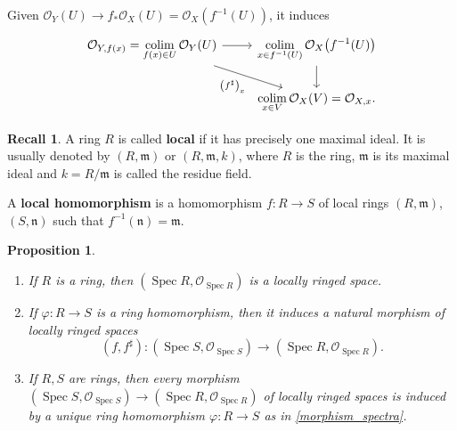 \documentclass[12pt]{article}
\DeclareMathOperator{\Spec}{Spec}
\DeclareMathOperator*{\colim}{colim}
\newtheorem*{proposition}{Proposition}
\theoremstyle{definition}
\newtheorem*{recall}{Recall}
\begin{document}
Given $\mathcal O_Y(U)\rightarrow f_*\mathcal O_X(U)=\mathcal O_X(f^{-1}(U))$, it induces
\[\begin{tikzcd}\mathcal O_{Y,f(x)}=\displaystyle{\colim_{f(x)\in U}\mathcal O_Y(U)}\arrow[r]\arrow[rd,"\left(f^\sharp\right)_x",swap]&\displaystyle{\colim_{x\in f^{-1}(U)}\mathcal O_X\big(f^{-1}(U)\big)}\arrow[d]\\&\displaystyle{\colim_{x\in V}\mathcal O_X(V)=\mathcal O_{X,x}.}\end{tikzcd}\]

\begin{recall}
A ring $R$ is called \textbf{local} if it has precisely one maximal ideal. It is usually denoted by $(R,\mathfrak m)$ or $(R,\mathfrak m,k)$, where $R$ is the ring, $\mathfrak m$ is its maximal ideal and $k=R/\mathfrak m$ is called the residue field.

A \textbf{local homomorphism} is a homomorphism $f:R\rightarrow S$ of local rings $(R,\mathfrak m)$, $(S,\mathfrak n)$ such that $f^{-1}(\mathfrak n)=\mathfrak m$.
\end{recall}

\begin{proposition}
\begin{enumerate}[label=\arabic*)]
\item If $R$ is a ring, then $(\Spec R,\mathcal O_{\Spec R})$ is a locally ringed space.

\item\label{morphism_spectra} If $\varphi:R\rightarrow S$ is a ring homomorphism, then it induces a natural morphism of locally ringed spaces
\[(f,f^\sharp):(\Spec S,\mathcal O_{\Spec S})\longrightarrow(\Spec R,\mathcal O_{\Spec R}).\]

\item If $R,S$ are rings, then every morphism $(\Spec S,\mathcal O_{\Spec S})\rightarrow(\Spec R,\mathcal O_{\Spec R})$ of locally ringed spaces is induced by a unique ring homomorphism $\varphi:R\rightarrow S$ as in \ref{morphism_spectra}.
\end{enumerate}
\end{proposition}
\end{document}
